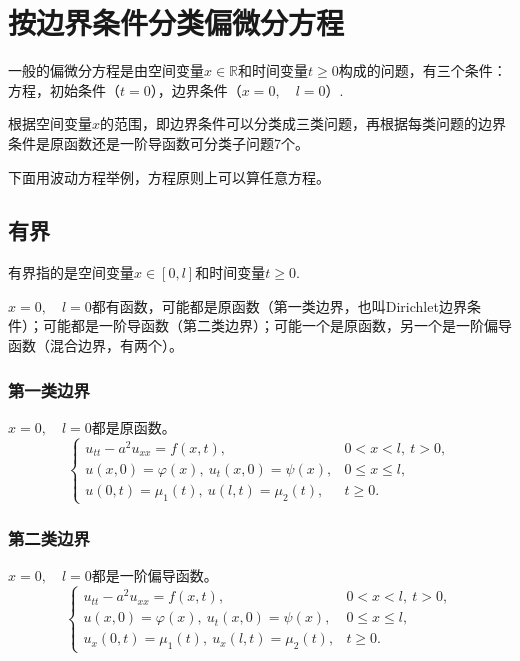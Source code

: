 \documentclass[a4paper, 12pt, oneside]{article} %
\newcommand{\R}{\mathbb{R}}
\numberwithin{subsection}{section}
\numberwithin{subsubsection}{subsection}
\theoremstyle{plain}
\theoremstyle{definition}
\theoremstyle{remark}
\begin{document}
		
		
		\section{按边界条件分类偏微分方程}
		一般的偏微分方程是由空间变量$x \in \R$和时间变量$t \geq 0$构成的问题，有三个条件：方程，初始条件（$t=0$），边界条件（$x=0, \quad l=0$）.
		
		根据空间变量$x$的范围，即边界条件可以分类成三类问题，再根据每类问题的边界条件是原函数还是一阶导函数可分类子问题7个。
		
		下面用波动方程举例，方程原则上可以算任意方程。
		\subsection{有界}
		有界指的是空间变量$x \in [0,l]$和时间变量$t \geq 0$.
		
		$x=0,\quad l=0$都有函数，可能都是原函数（第一类边界，也叫Dirichlet边界条件）；可能都是一阶导函数（第二类边界）；可能一个是原函数，另一个是一阶偏导函数（混合边界，有两个）。
		\subsubsection{第一类边界}
		$x=0,\quad l=0$都是原函数。
		\begin{equation}\label{eq:wave_bounded_dirichlet}
			\begin{cases}
				u_{tt} - a^2 u_{xx} = f(x, t), & 0 < x < l, \ t > 0, \\
				u(x, 0) = \varphi(x), \ u_t(x, 0) = \psi(x), & 0 \leq x \leq l, \\
				u(0, t) = \mu_1(t), \ u(l, t) = \mu_2(t), & t \geq 0.
			\end{cases}
		\end{equation}
		\subsubsection{第二类边界}
		$x=0,\quad l=0$都是一阶偏导函数。
		\begin{equation}\label{eq:wave_bounded_neumann}
			\begin{cases}
				u_{tt} - a^2 u_{xx} = f(x, t), & 0 < x < l, \ t > 0, \\
				u(x, 0) = \varphi(x), \ u_t(x, 0) = \psi(x), & 0 \leq x \leq l, \\
				u_x(0, t) = \mu_1(t), \ u_x(l, t) = \mu_2(t), & t \geq 0.
			\end{cases}
		\end{equation}
		
\end{document}
